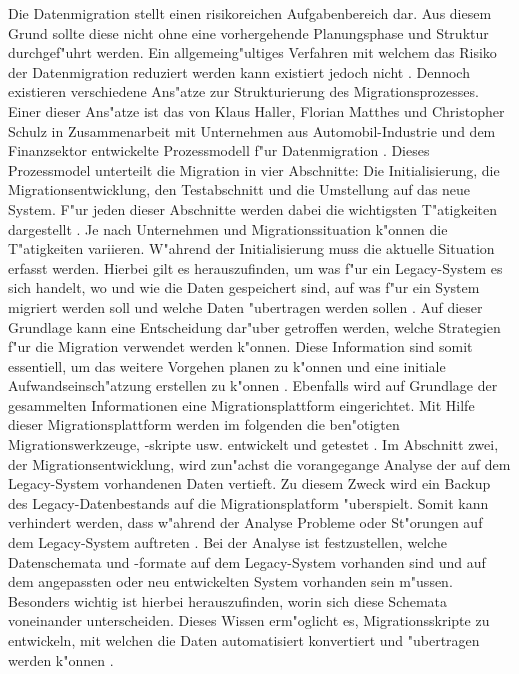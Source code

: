 Die Datenmigration stellt einen risikoreichen Aufgabenbereich dar. Aus diesem Grund sollte diese nicht ohne eine vorhergehende Planungsphase und Struktur durchgef"uhrt werden. Ein allgemeing"ultiges Verfahren mit welchem das Risiko der Datenmigration reduziert werden kann existiert jedoch nicht \citep[S.~3]{wuLawless-1997}. Dennoch existieren verschiedene Ans"atze zur Strukturierung des Migrationsprozesses. Einer dieser Ans"atze ist das von Klaus Haller, Florian Matthes und Christopher Schulz in Zusammenarbeit mit Unternehmen aus Automobil-Industrie und dem Finanzsektor entwickelte Prozessmodell f"ur Datenmigration \citep[S.~2f.]{klausMatthesSchulz-2012}. 
\lb
Dieses Prozessmodel unterteilt die Migration in vier Abschnitte: Die Initialisierung, die Migrationsentwicklung, den Testabschnitt und die Umstellung auf das neue System. F"ur jeden dieser Abschnitte werden dabei die wichtigsten T"atigkeiten dargestellt \citep[S.~5f]{klausMatthesSchulz-2012}. Je nach Unternehmen und Migrationssituation k"onnen die T"atigkeiten variieren.
\lb
W"ahrend der Initialisierung muss die aktuelle Situation erfasst werden. Hierbei gilt es herauszufinden, um was f"ur ein Legacy-System es sich handelt, wo und wie die Daten gespeichert sind, auf was f"ur ein System migriert werden soll und welche Daten "ubertragen werden sollen \citep[S.~7]{klausMatthesSchulz-2012}. Auf dieser Grundlage kann eine Entscheidung dar"uber getroffen werden, welche Strategien f"ur die Migration verwendet werden k"onnen. Diese Information sind somit essentiell, um das weitere Vorgehen planen zu k"onnen und eine initiale Aufwandseinsch"atzung erstellen zu k"onnen \citep[S.~7]{klausMatthesSchulz-2012}. Ebenfalls wird auf Grundlage der gesammelten Informationen eine Migrationsplattform eingerichtet. Mit Hilfe dieser Migrationsplattform werden im folgenden die ben"otigten Migrationswerkzeuge, -skripte usw. entwickelt und getestet \citep[S.~7]{klausMatthesSchulz-2012}.
\lb
Im Abschnitt zwei, der Migrationsentwicklung, wird zun"achst die vorangegange Analyse der auf dem Legacy-System vorhandenen Daten vertieft. Zu diesem Zweck wird ein Backup des Legacy-Datenbestands auf die Migrationsplatform "uberspielt. Somit kann verhindert werden, dass w"ahrend der Analyse Probleme oder St"orungen auf dem Legacy-System auftreten \citep[S.~7]{klausMatthesSchulz-2012}. Bei der Analyse ist festzustellen, welche Datenschemata und -formate auf dem Legacy-System vorhanden sind und auf dem angepassten oder neu entwickelten System vorhanden sein m"ussen. Besonders wichtig ist hierbei herauszufinden, worin sich diese Schemata voneinander unterscheiden. Dieses Wissen erm"oglicht es, Migrationsskripte zu entwickeln, mit welchen die Daten automatisiert konvertiert und "ubertragen werden k"onnen \citep[S.~7f.]{klausMatthesSchulz-2012}. 
